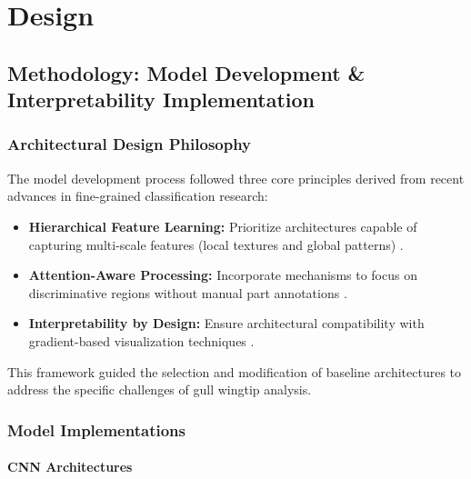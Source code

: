 \chapter{Design}

\section{Methodology: Model Development \& Interpretability Implementation}

\subsection{Architectural Design Philosophy}
The model development process followed three core principles derived from recent advances in fine-grained classification research:
\begin{itemize}
    \item \textbf{Hierarchical Feature Learning:} Prioritize architectures capable of capturing multi-scale features (local textures and global patterns) \cite{source3, source11}.
    \item \textbf{Attention-Aware Processing:} Incorporate mechanisms to focus on discriminative regions without manual part annotations \cite{source9, source18}.
    \item \textbf{Interpretability by Design:} Ensure architectural compatibility with gradient-based visualization techniques \cite{source6, source12}.
\end{itemize}

This framework guided the selection and modification of baseline architectures to address the specific challenges of gull wingtip analysis.

\subsection{Model Implementations}

\subsubsection{CNN Architectures}
